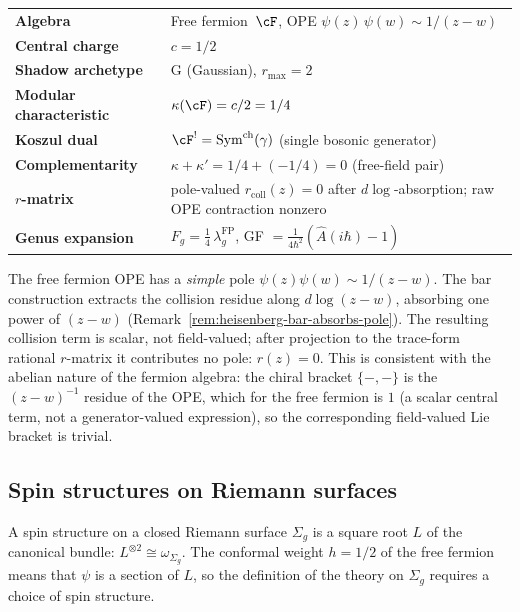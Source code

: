 \begin{center}
\renewcommand{\arraystretch}{1.3}
\begin{tabular}{ll}
\textbf{Algebra} & Free fermion~$\cF$,
OPE $\psi(z)\,\psi(w) \sim 1/(z{-}w)$ \\
\textbf{Central charge} & $c = 1/2$ \\
\textbf{Shadow archetype} & G (Gaussian), $r_{\max} = 2$ \\
\textbf{Modular characteristic} & $\kappa(\cF) = c/2 = 1/4$ \\
\textbf{Koszul dual} & $\cF^! = \mathrm{Sym}^{\mathrm{ch}}(\gamma)$
(single bosonic generator) \\
\textbf{Complementarity} & $\kappa + \kappa' = 1/4 + (-1/4) = 0$ \textup{(}free-field pair\textup{)} \\
\textbf{$r$-matrix} & pole-valued \(r_{\mathrm{coll}}(z)=0\)
after \(d\log\)-absorption; raw OPE contraction nonzero \\
\textbf{Genus expansion} & $F_g = \tfrac{1}{4}\,\lambda_g^{\mathrm{FP}}$,
GF $= \tfrac{1}{4\hbar^2}(\hat{A}(i\hbar) - 1)$
\end{tabular}
\end{center}

\begin{remark}
\label{rem:fermion-r-matrix-vanishing}
The free fermion OPE has a \emph{simple} pole
$\psi(z)\psi(w) \sim 1/(z{-}w)$. The bar construction
extracts the collision residue along $d\log(z{-}w)$,
absorbing one power of $(z{-}w)$
(Remark~\ref{rem:heisenberg-bar-absorbs-pole}). The resulting
collision term is scalar, not field-valued; after projection to the
trace-form rational $r$-matrix it contributes no pole:
$r(z)=0$. This is consistent with the abelian nature of the fermion
algebra: the chiral bracket $\{-,-\}$ is the $(z{-}w)^{-1}$ residue
of the OPE, which for the free fermion is $1$ (a scalar central
term, not a generator-valued expression), so the corresponding
field-valued Lie bracket is trivial.
\end{remark}

\subsection{Spin structures on Riemann surfaces}
\label{subsec:spin-structures}

A spin structure on a closed Riemann surface $\Sigma_g$ is a
square root $L$ of the canonical bundle: $L^{\otimes 2} \cong
\omega_{\Sigma_g}$. The conformal weight $h = 1/2$ of the
free fermion means that $\psi$ is a section of $L$, so the
definition of the theory on $\Sigma_g$ requires a choice
of spin structure.


